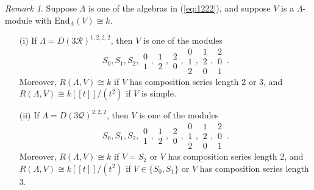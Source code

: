 \documentclass{amsart}
\theoremstyle{plain}
\theoremstyle{definition}
\theoremstyle{remark}
\newtheorem{rem}[thm]{Remark}
\begin{document}
\begin{rem}
\label{rem:moredetail2}
Suppose $\Lambda$ is one of the algebras in (\ref{eq:1222}), and suppose $V$ is a $\Lambda$-module with
$\mathrm{End}_\Lambda(V)\cong k$. 
\begin{enumerate}
\item[(i)] If $\Lambda=D(3\mathcal{R})^{1,2,2,2}$, then $V$ is one of the modules
$$S_0,S_1,S_2,\begin{array}{c}0\\1\end{array},\begin{array}{c}1\\2\end{array}, \begin{array}{c}2\\0\end{array},
\begin{array}{c}0\\1\\2\end{array}, \begin{array}{c}1\\2\\0\end{array}, \begin{array}{c}2\\0\\1\end{array}\,.$$
Moreover, $R(\Lambda,V)\cong k$ if  $V$ has composition series length 2 or 3, and
$R(\Lambda,V)\cong k[[t]]/(t^2)$ if $V$ is simple.

\item[(ii)] If $\Lambda=D(3\mathcal{Q})^{2,2,2}$, then $V$ is one of the modules
$$S_0,S_1,S_2,\begin{array}{c}0\\1\end{array},\begin{array}{c}1\\2\end{array}, \begin{array}{c}2\\0\end{array},
\begin{array}{c}0\\1\\2\end{array}, \begin{array}{c}1\\2\\0\end{array}, \begin{array}{c}2\\0\\1\end{array}\,.$$
Moreover, $R(\Lambda,V)\cong k$ if $V=S_2$ or $V$ has composition series length 2, and
$R(\Lambda,V)\cong k[[t]]/(t^2)$ if $V\in\{S_0, S_1\}$ or $V$ has composition series length 3.


\end{enumerate}
\end{rem}
\end{document}
